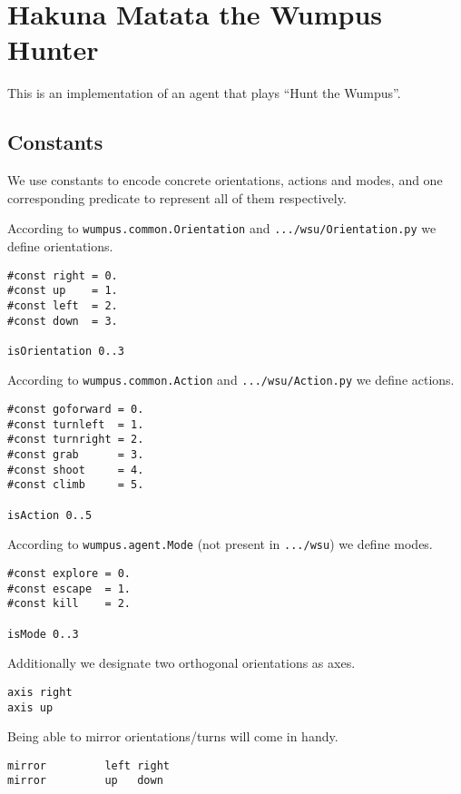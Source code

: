 \hypertarget{hakuna-matata-the-wumpus-hunter}{%
\section{Hakuna Matata the Wumpus
Hunter}\label{hakuna-matata-the-wumpus-hunter}}

This is an implementation of an agent that plays ``Hunt the Wumpus''.

\hypertarget{constants}{%
\subsection{Constants}\label{constants}}

We use constants to encode concrete orientations, actions and modes, and
one corresponding predicate to represent all of them respectively.

According to \texttt{wumpus.common.Orientation} and
\texttt{.../wsu/Orientation.py} we define orientations.

\begin{verbatim}
#const right = 0.
#const up    = 1.
#const left  = 2.
#const down  = 3.

isOrientation 0..3
\end{verbatim}

According to \texttt{wumpus.common.Action} and
\texttt{.../wsu/Action.py} we define actions.

\begin{verbatim}
#const goforward = 0.
#const turnleft  = 1.
#const turnright = 2.
#const grab      = 3.
#const shoot     = 4.
#const climb     = 5.

isAction 0..5
\end{verbatim}

According to \texttt{wumpus.agent.Mode} (not present in
\texttt{.../wsu}) we define modes.

\begin{verbatim}
#const explore = 0.
#const escape  = 1.
#const kill    = 2.

isMode 0..3
\end{verbatim}

Additionally we designate two orthogonal orientations as axes.

\begin{verbatim}
axis right
axis up
\end{verbatim}

Being able to mirror orientations/turns will come in handy.

\begin{verbatim}
mirror         left right
mirror         up   down
\end{verbatim}

